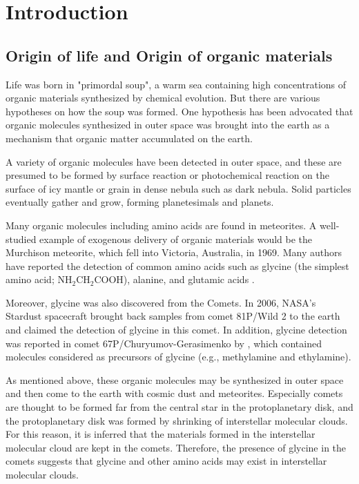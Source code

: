 \chapter{Introduction
  \label{chap:introduction}}


\section{Origin of life and Origin of organic materials}
Life was born in "primordal soup", a warm sea containing high concentrations of organic materials synthesized by chemical evolution. But there are various hypotheses on how the soup was formed.
One hypothesis has been advocated that organic molecules synthesized in outer space 
was brought into the earth as a mechanism that organic matter accumulated on the earth.

A variety of organic molecules have been detected in outer space, and these are presumed 
to be formed by surface reaction or photochemical reaction on the surface of icy mantle or grain 
in dense nebula such as dark nebula.
Solid particles eventually gather and grow, forming planetesimals and planets.

Many organic molecules including amino acids are found in meteorites.
A well-studied example of exogenous delivery of organic materials would
be the Murchison meteorite, which fell into Victoria, Australia, in 1969. 
Many authors have reported the detection of common amino acids such as glycine 
(the simplest amino acid; NH$_2$CH$_2$COOH), alanine, and glutamic acids \citep[e.g., ][]{Engel+Nagy1982}.

Moreover, glycine was also discovered from the Comets. 
In 2006, NASA's Stardust spacecraft brought back samples from comet 81P/Wild 2 to the earth 
and \citet{Elsila+2009} claimed the detection of glycine in this comet.
In addition, glycine detection was reported in comet 67P/Churyumov-Gerasimenko by \citet{Altwegg+2016},
which contained molecules considered as precursors of glycine (e.g., methylamine and ethylamine).

As mentioned above, these organic molecules may be synthesized in outer space and then 
come to the earth with cosmic dust and meteorites.
Especially comets are thought to be formed far from the central star in the protoplanetary disk, 
and the protoplanetary disk was formed by shrinking of interstellar molecular clouds. 
For this reason, it is inferred that the materials formed in the interstellar molecular cloud 
are kept in the comets.
Therefore, the presence of glycine in the comets suggests that glycine and other amino acids 
may exist in interstellar molecular clouds.

